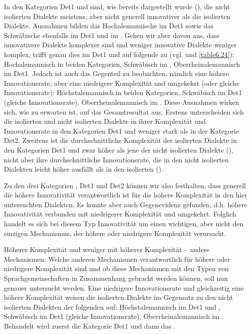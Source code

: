 In den Kategorien Det1 und  sind, wie bereits dargestellt wurde (), die nicht isolierten Dialekte meistens, aber nicht generell innovativer als die isolierten Dialekte. Ausnahmen bilden das Hochalemannische im Det1 sowie das Schwäbische ebenfalls im Det1 und im . Gehen wir aber davon aus, dass innovativere Dialekte komplexer sind und weniger innovative Dialekte weniger komplex, trifft genau dies im Det1 und  auf folgende  zu (vgl.  und \ref{table6.24}): Hochalemannisch in beiden Kategorien, Schwäbisch im , Oberrheinalemannisch im Det1. Jedoch ist auch das Gegenteil zu beobachten, nämlich eine höhere Innovationsrate, aber eine niedrigere Komplexität und umgekehrt (oder gleiche Innovationsrate): Höchstalemannisch in beiden Kategorien, Schwäbisch im Det1 (gleiche Innovationsrate), Oberrheinalemannisch im . Diese Ausnahmen wirken sich, wie zu erwarten ist, auf das Gesamtresultat aus. Erstens unterscheiden sich die isolierten und nicht isolierten Dialekte in ihrer Komplexität und Innovationsrate in den Kategorien Det1 und  weniger stark als in der Kategorie Det2. Zweitens ist die durchschnittliche Komplexität der isolierten Dialekte in den Kategorien Det1 und  zwar höher als jene der nicht isolierten Dialekte (), nicht aber ihre durchschnittliche Innovationsrate, die in den nicht isolierten Dialekten leicht höher ausfällt als in den isolierten ().

Zu den drei Kategorien , Det1 und Det2 können wir also festhalten, dass generell die höhere Innovativität verantwortlich ist für die höhere Komplexität in den hier untersuchten Dialekten. Es konnte aber auch Gegenevidenz gefunden, d.h. höhere Innovativität verbunden mit niedrigerer Komplexität und umgekehrt. Folglich handelt es sich bei diesem Typ Innovativität um einen wichtigen, aber nicht den einzigen Mechanismus, der höhere oder niedrigere Komplexität verursacht.

{Höherer Komplexität und weniger  mit höherer Komplexität – andere Mechanismen:} Welche anderen Mechanismen verantwortlich für höhere oder niedrigere Komplexität sind und ob diese Mechanismen mit den Typen von Sprachgemeinschaften in Zusammenhang gebracht werden können, soll nun genauer untersucht werden. Eine niedrigere Innovationsrate und gleichzeitig eine höhere Komplexität weisen die isolierten Dialekte im Gegensatz zu den nicht isolierten Dialekten der folgenden  auf: Höchstalemannisch im Det1 und , Schwäbisch im Det1 (gleiche Innovationsrate), Oberrheinalemannisch im . Behandelt wird zuerst die Kategorie Det1 und dann das .

